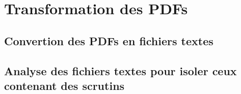 \section{Transformation des PDFs}

\subsection{Convertion des PDFs en fichiers textes}

\subsection[Analyse des fichiers textes pour isoler les scrutins]{Analyse des fichiers textes pour isoler ceux contenant des scrutins}
